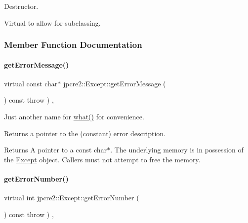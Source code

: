 Destructor. 

Virtual to allow for subclassing. 

\subsubsection{Member Function Documentation}
\hypertarget{classjpcre2_1_1Except_a6781e0804575f11d6d8bb87ec2d036c6_a6781e0804575f11d6d8bb87ec2d036c6}{}\label{classjpcre2_1_1Except_a6781e0804575f11d6d8bb87ec2d036c6_a6781e0804575f11d6d8bb87ec2d036c6} 
\paragraph{\texorpdfstring{get\+Error\+Message()}{getErrorMessage()}}
{\footnotesize\ttfamily virtual const char$\ast$ jpcre2\+::\+Except\+::get\+Error\+Message (\begin{DoxyParamCaption}{ }\end{DoxyParamCaption}) const throw  ) \hspace{0.3cm}{\ttfamily [inline]}, {\ttfamily [virtual]}}



Just another name for \hyperlink{classjpcre2_1_1Except_aa16bdec8432ee950955f7ad81a9655bb_aa16bdec8432ee950955f7ad81a9655bb}{what()} for convenience. 

Returns a pointer to the (constant) error description. \begin{DoxyReturn}{Returns}
A pointer to a const char$\ast$. The underlying memory is in possession of the \hyperlink{classjpcre2_1_1Except}{Except} object. Callers must not attempt to free the memory. 
\end{DoxyReturn}
\hypertarget{classjpcre2_1_1Except_a0f3e00116ab24b89836a2c2a66262e22_a0f3e00116ab24b89836a2c2a66262e22}{}\label{classjpcre2_1_1Except_a0f3e00116ab24b89836a2c2a66262e22_a0f3e00116ab24b89836a2c2a66262e22} 
\paragraph{\texorpdfstring{get\+Error\+Number()}{getErrorNumber()}}
{\footnotesize\ttfamily virtual int jpcre2\+::\+Except\+::get\+Error\+Number (\begin{DoxyParamCaption}{ }\end{DoxyParamCaption}) const throw  ) \hspace{0.3cm}{\ttfamily [inline]}, {\ttfamily [virtual]}}



